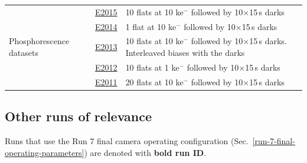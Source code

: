 \begin{longtable}{|p{5.0cm}|p{1.5cm}|p{8.5cm}|}
\multirow{5}{*}{Phosphorescence datasets} & \href{https://s3df.slac.stanford.edu/data/rubin/lsstcam/E2015/w_2024_35/}{E2015} & 10 flats at 10 ke$^-$ followed by 10$\times$15\,s darks \\ \cline{2-3} 
                                          & \href{https://s3df.slac.stanford.edu/data/rubin/lsstcam/E2014/w_2024_35/}{E2014} & 1 flat at 10 ke$^-$ followed by 10$\times$15\,s darks \\ \cline{2-3} 
                                          & \href{https://s3df.slac.stanford.edu/data/rubin/lsstcam/E2013/w_2024_35/}{E2013} & 10 flats at 10 ke$^-$ followed by 10$\times$15\,s darks. Interleaved biases with the darks \\ \cline{2-3} 
                                          & \href{https://s3df.slac.stanford.edu/data/rubin/lsstcam/E2012/w_2024_35/}{E2012} & 10 flats at 1 ke$^-$ followed by 10$\times$15\,s darks \\ \cline{2-3} 
                                          & \href{https://s3df.slac.stanford.edu/data/rubin/lsstcam/E2011/w_2024_35/}{E2011} & 20 flats at 10 ke$^-$ followed by 10$\times$15\,s darks \\ \hline

\end{longtable}




\subsection{Other runs of relevance}\label{relevant-runs}

Runs that use the Run 7 final camera operating configuration (Sec.~\ref{run-7-final-operating-parameters}) are denoted with \textbf{bold run ID}.

